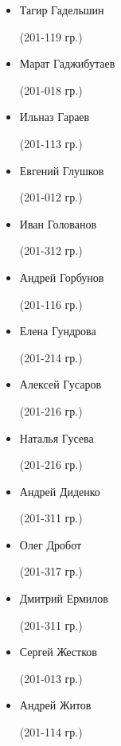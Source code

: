 \begin{multicols}{2}
\begin{small}
\begin{itemize}[leftmargin=*]
	\item[] Тагир Гадельшин\begin{tiny} (201-119 гр.)\end{tiny}
	\item[] Марат Гаджибутаев\begin{tiny} (201-018 гр.)\end{tiny}
	\item[] Ильназ Гараев\begin{tiny} (201-113 гр.)\end{tiny}
	\item[] Евгений Глушков\begin{tiny} (201-012 гр.)\end{tiny}
	\item[] Иван Голованов\begin{tiny} (201-312 гр.)\end{tiny} %
	\item[] Андрей Горбунов\begin{tiny} (201-116 гр.)\end{tiny} %
	\item[] Елена Гундрова\begin{tiny} (201-214 гр.)\end{tiny}
	\item[] Алексей Гусаров\begin{tiny} (201-216 гр.)\end{tiny}
	\item[] Наталья Гусева\begin{tiny} (201-216 гр.)\end{tiny} %

	\item[] Андрей Диденко\begin{tiny} (201-311 гр.)\end{tiny} %
	\item[] Олег Дробот\begin{tiny} (201-317 гр.)\end{tiny} %

	\item[] Дмитрий Ермилов\begin{tiny} (201-311 гр.)\end{tiny} %

	\item[] Сергей Жестков\begin{tiny} (201-013 гр.)\end{tiny}
	\item[] Андрей Житов\begin{tiny} (201-114 гр.)\end{tiny} %


\end{itemize}
\end{small}
\end{multicols}
